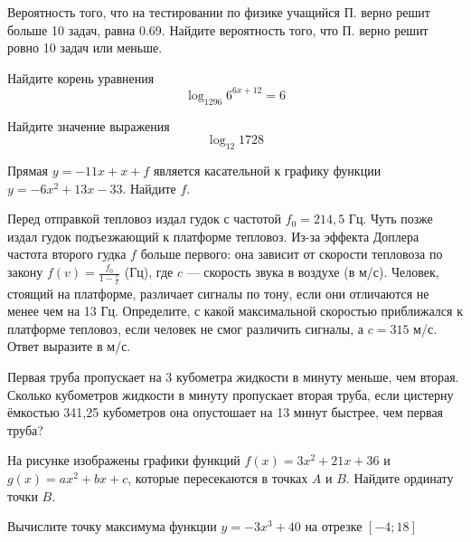 \documentclass[twocolumn]{article}
\begin{document}
\begin{taskBN}{4}
Вероятность того, что на тестировании по физике учащийся П. верно решит больше 10 задач, равна 0.69. Найдите вероятность того, что П. верно решит ровно 10 задач  или меньше.
\end{taskBN}

\begin{taskBN}{5}
Найдите корень уравнения $$\log_{1296}{6^{6x+12}}=6$$
\end{taskBN}

\begin{taskBN}{6}
Найдите значение выражения $$ \log_{12}1728 $$
\end{taskBN}

\begin{taskBN}{7}
Прямая $y=-11x+x+f$ является касательной к графику функции $y=-6x^{2}+13x-33$. Найдите $f$.
\end{taskBN}

\begin{taskBN}{8}
Перед отправкой тепловоз издал гудок с частотой $f_0 = 214,5$ Гц. Чуть позже издал гудок подъезжающий к платформе тепловоз. Из-за эффекта Доплера частота второго гудка $f$ больше первого: она зависит от скорости тепловоза по закону $f(v)=\frac{f_0}{1-\frac{v}{c}}$ (Гц), где $c$ — скорость звука в воздухе (в м/с). Человек, стоящий на платформе, различает сигналы по тону, если они отличаются не менее чем на 13 Гц. Определите, с какой максимальной скоростью приближался к платформе тепловоз, если человек не смог различить сигналы, а $c = 315$ м/с. Ответ выразите в м/с.
\end{taskBN}

\begin{taskBN}{9}
Первая труба пропускает на 3 кубометра жидкости в минуту меньше, чем вторая. Сколько кубометров жидкости в минуту пропускает вторая труба, если цистерну ёмкостью 341,25 кубометров она опустошает на 13 минут быстрее, чем первая труба?

\end{taskBN}

\begin{taskBN}{10}
На рисунке изображены графики функций $f(x)=3x^{2}+21x+36$ и $g(x)=ax^{2} +bx+c$, которые пересекаются в точках $A$ и $B$. Найдите ординату точки $B$.\vspace{2.5cm}
\end{taskBN}

\begin{taskBN}{11}
Вычислите точку максимума функции $y = -3x^{3}+40$ на отрезке $\left[-4;18 \right]$
\end{taskBN}
\end{document}
